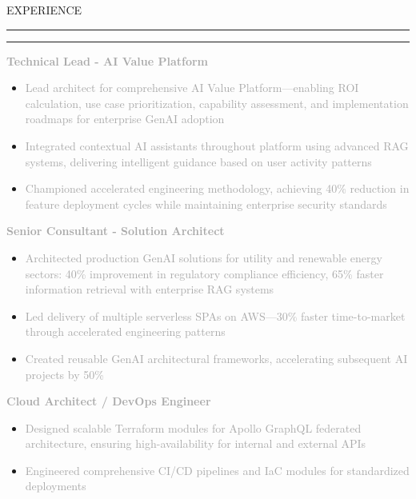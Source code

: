 \documentclass[10pt,letterpaper]{article}
\newcommand{\mainheader}[1]{%
    \vspace{8pt}
    {\displayfont\Large\textcolor{accent}{\MakeUppercase{#1}}}
    \vspace{2pt}
    \par\noindent\textcolor{accent}{\rule{4.7in}{2pt}}
    \vspace{5pt}
}
\newcommand{\companyHeader}[2]{%
    \vspace{5pt}
    \noindent\textcolor{#2}{\rule{3pt}{10pt}}\hspace{6pt}{\headingfont\normalsize\textbf{\textcolor{darkgray}{#1}}}
    \vspace{2pt}
}
\newcommand{\positionHeader}[2]{%
    \noindent\textbf{\textcolor{darkgray}{#2}}\hspace{4pt}{\footnotesize\textcolor{mediumgray}{//}}\hspace{4pt}{\footnotesize\itshape\textcolor{mediumgray}{#1}}
    \vspace{1pt}
}
\begin{document}
\begin{minipage}[t][10.5in][t]{5.3in}
\vspace{0.4in}
\hspace{0.3in}
\begin{minipage}{4.7in}
\raggedright

\mainheader{Experience}

\companyHeader{Slalom}{company1}

\positionHeader{2023 – Present}{Technical Lead - AI Value Platform}
\begin{itemize}
    \setlength\itemsep{1pt}
    \item\small\textcolor{darkgray}{Lead architect for comprehensive AI Value Platform—enabling ROI calculation, use case prioritization, capability assessment, and implementation roadmaps for enterprise GenAI adoption}
    \item\small\textcolor{darkgray}{Integrated contextual AI assistants throughout platform using advanced RAG systems, delivering intelligent guidance based on user activity patterns}
    \item\small\textcolor{darkgray}{Championed accelerated engineering methodology, achieving 40\% reduction in feature deployment cycles while maintaining enterprise security standards}
\end{itemize}

\vspace{2pt}

\positionHeader{2022 – 2023}{Senior Consultant - Solution Architect}
\begin{itemize}
    \setlength\itemsep{1pt}
    \item\small\textcolor{darkgray}{Architected production GenAI solutions for utility and renewable energy sectors: 40\% improvement in regulatory compliance efficiency, 65\% faster information retrieval with enterprise RAG systems}
    \item\small\textcolor{darkgray}{Led delivery of multiple serverless SPAs on AWS—30\% faster time-to-market through accelerated engineering patterns}
    \item\small\textcolor{darkgray}{Created reusable GenAI architectural frameworks, accelerating subsequent AI projects by 50\%}
\end{itemize}

\vspace{2pt}

\positionHeader{2022}{Cloud Architect / DevOps Engineer}
\begin{itemize}
    \setlength\itemsep{1pt}
    \item\small\textcolor{darkgray}{Designed scalable Terraform modules for Apollo GraphQL federated architecture, ensuring high-availability for internal and external APIs}
    \item\small\textcolor{darkgray}{Engineered comprehensive CI/CD pipelines and IaC modules for standardized deployments}
\end{itemize}


\end{minipage}
\end{minipage}
\end{document}
